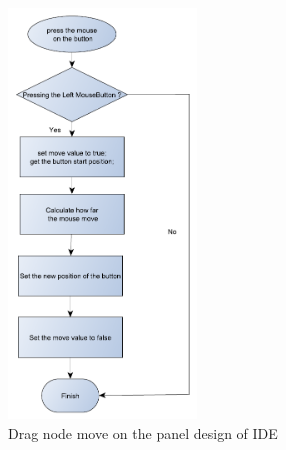 \begin{figure}[!ht]
	\begin{center}
		\includegraphics[width=50mm]{./Images/Software/drag_button_on_panel.png}
		\caption{Drag node move on the panel design of IDE}
		\label{drag_button_on_panel}
	\end{center}
\end{figure}
